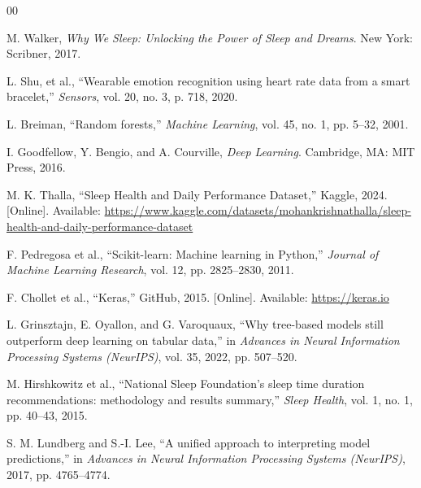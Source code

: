 \documentclass[conference]{IEEEtran}
\begin{document}
\begin{thebibliography}{00}

M. Walker, \textit{Why We Sleep: Unlocking the Power of Sleep and Dreams}. New York: Scribner, 2017.

L. Shu, et al., ``Wearable emotion recognition using heart rate data from a smart bracelet,'' \textit{Sensors}, vol. 20, no. 3, p. 718, 2020.

L. Breiman, ``Random forests,'' \textit{Machine Learning}, vol. 45, no. 1, pp. 5--32, 2001.

I. Goodfellow, Y. Bengio, and A. Courville, \textit{Deep Learning}. Cambridge, MA: MIT Press, 2016.

M. K. Thalla, ``Sleep Health and Daily Performance Dataset,'' Kaggle, 2024. [Online]. Available: \url{https://www.kaggle.com/datasets/mohankrishnathalla/sleep-health-and-daily-performance-dataset}

F. Pedregosa et al., ``Scikit-learn: Machine learning in Python,'' \textit{Journal of Machine Learning Research}, vol. 12, pp. 2825--2830, 2011.

F. Chollet et al., ``Keras,'' GitHub, 2015. [Online]. Available: \url{https://keras.io}

L. Grinsztajn, E. Oyallon, and G. Varoquaux, ``Why tree-based models still outperform deep learning on tabular data,'' in \textit{Advances in Neural Information Processing Systems (NeurIPS)}, vol. 35, 2022, pp. 507--520.

M. Hirshkowitz et al., ``National Sleep Foundation's sleep time duration recommendations: methodology and results summary,'' \textit{Sleep Health}, vol. 1, no. 1, pp. 40--43, 2015.

S. M. Lundberg and S.-I. Lee, ``A unified approach to interpreting model predictions,'' in \textit{Advances in Neural Information Processing Systems (NeurIPS)}, 2017, pp. 4765--4774.

\end{thebibliography}
\end{document}
